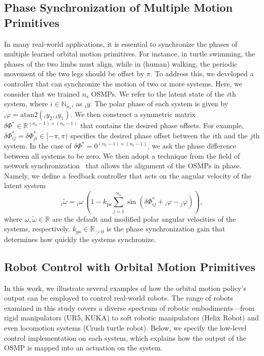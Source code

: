 \subsection{Phase Synchronization of Multiple Motion Primitives}
In many real-world applications, it is essential to synchronize the phases of multiple learned orbital motion primitives. For instance, in turtle swimming, the phases of the two limbs must align, while in (human) walking, the periodic movement of the two legs should be offset by $\pi$. To address this, we developed a controller that can synchronize the motion of two or more systems.
Here, we consider that we trained $n_\mathrm{s}$ \glspl{OSMP}. We refer to the latent state of the $i$th system, where $i \in \mathbb{N}_{n_\mathrm{s}}$, as ${}_{i} y$. The polar phase of each system is given by ${}_{i} \varphi = \mathrm{atan2}({}_{i} y_2, {}_{i} y_1)$. We then construct a symmetric matrix $\delta \Phi^* \in \mathbb{R}^{(n_\mathrm{s}-1) \times (n_\mathrm{s}-1)}$ that contains the desired phase offsets. For example, $\delta \Phi^*_{ij} = \delta \Phi^*_{ji} \in [-\pi, \pi)$ specifies the desired phase offset between the $i$th and the $j$th system. In the case of $\delta \Phi^* = 0^{(n_\mathrm{s}-1) \times (n_\mathrm{s}-1)}$, we ask the phase difference between all systems to be zero.
We then adopt a technique from the field of network synchronization~\citep{dorfler2014synchronization} that allows the alignment of the \glspl{OSMP} in phase. Namely, we define a feedback controller that acts on the angular velocity of the latent system
\begin{equation}
    {}_{i} \tilde{\omega} = {}_{i} \omega \, \left (1  -k_\mathrm{ps} \sum_{j=1}^{n_\mathrm{s}} \sin \left ( \delta \Phi^*_{ij} + {}_{i} \varphi - {}_{j} \varphi \right ) \right ),
\end{equation}
where $\omega, \tilde{\omega} \in \mathbb{R}$ are the default and modified polar angular velocities of the systems, respectively. 
$k_\mathrm{ps} \in \mathbb{R}_{>0}$ is the phase synchronization gain that determines how quickly the systems synchronize.

\subsection{Robot Control with Orbital Motion Primitives}
In this work, we illustrate several examples of how the orbital motion policy’s output can be employed to control real-world robots. The range of robots examined in this study covers a diverse spectrum of robotic embodiments—from rigid manipulators (UR5, KUKA) to soft robotic manipulators (Helix Robot) and even locomotion systems (Crush turtle robot).
Below, we specify the low-level control implementation on each system, which explains how the output of the \gls{OSMP} is mapped into an actuation on the system.

